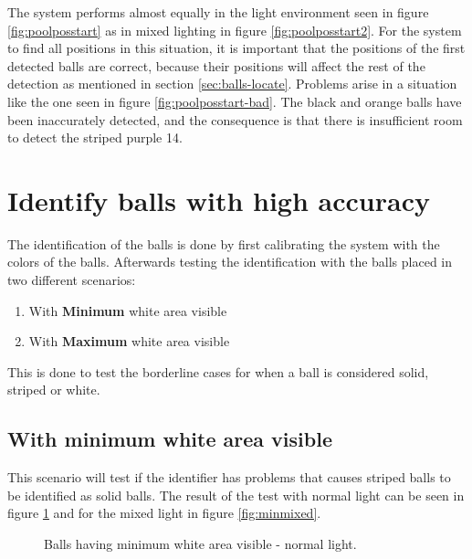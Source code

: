 The system performs almost equally in the light environment seen in figure \ref{fig:poolposstart} as in mixed lighting in figure \ref{fig:poolposstart2}. For the system to find all positions in this situation, it is important that the positions of the first detected balls are correct, because their positions will affect the rest of the detection as mentioned in section \ref{sec:balls-locate}. Problems arise in a situation like the one seen in figure \ref{fig:poolposstart-bad}. The black and orange balls have been inaccurately detected, and the consequence is that there is insufficient room to detect the striped purple 14.


\section{Identify balls with high accuracy}
The identification of the balls is done by first calibrating the system with the colors of the balls. Afterwards testing the identification with the balls placed in two different scenarios:

\begin{enumerate}
\setlength{\itemsep}{0mm}
	\item With \textbf{Minimum} white area visible
	\item With \textbf{Maximum} white area visible
\end{enumerate}
This is done to test the borderline cases for when a ball is considered solid, striped or white.

\subsection{With minimum white area visible}
This scenario will test if the identifier has problems that causes striped balls to be identified as solid balls.
The result of the test with normal light can be seen in figure \ref{fig:minnormal} and for the mixed light in figure \ref{fig:minmixed}.
\begin{figure}[htpb]
  \centering
  \quad
	\quad
   \caption{Balls having minimum white area visible - normal light.}
  \label{fig:minnormal}
\end{figure}


